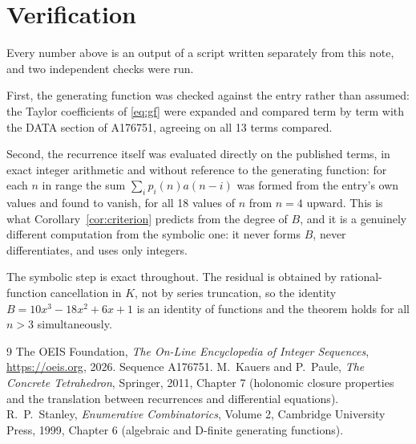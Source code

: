 \documentclass[11pt,a4paper]{article}
\theoremstyle{plain}
\theoremstyle{definition}
\begin{document}
\section{Verification}

Every number above is an output of a script written separately from this note, and two
independent checks were run.

First, the generating function was checked against the entry rather than assumed: the
Taylor coefficients of \eqref{eq:gf} were expanded and compared term by term with the DATA
section of A176751, agreeing on all 13 terms compared.

Second, the recurrence itself was evaluated directly on the published terms, in exact
integer arithmetic and without reference to the generating function: for each $n$ in range
the sum $\sum_{i}p_{i}(n)a(n-i)$ was formed from the entry's own values and found to
vanish, for all 18 values of $n$ from $n=4$ upward. This is what
Corollary~\ref{cor:criterion} predicts from the degree of $B$, and it is a genuinely
different computation from the symbolic one: it never forms $B$, never differentiates, and
uses only integers.

The symbolic step is exact throughout. The residual is obtained by rational-function
cancellation in $K$, not by series truncation, so the identity $B=10 x^{3} - 18 x^{2} + 6 x + 1$ is an
identity of functions and the theorem holds for all $n>3$ simultaneously.

\begin{thebibliography}{9}
 The OEIS Foundation, \emph{The On-Line Encyclopedia of Integer Sequences},
\url{https://oeis.org}, 2026. Sequence A176751.
 M.~Kauers and P.~Paule, \emph{The Concrete Tetrahedron}, Springer, 2011,
Chapter 7 (holonomic closure properties and the translation between recurrences and
differential equations).
 R.~P.~Stanley, \emph{Enumerative Combinatorics}, Volume 2, Cambridge
University Press, 1999, Chapter 6 (algebraic and D-finite generating functions).
\end{thebibliography}
\end{document}
